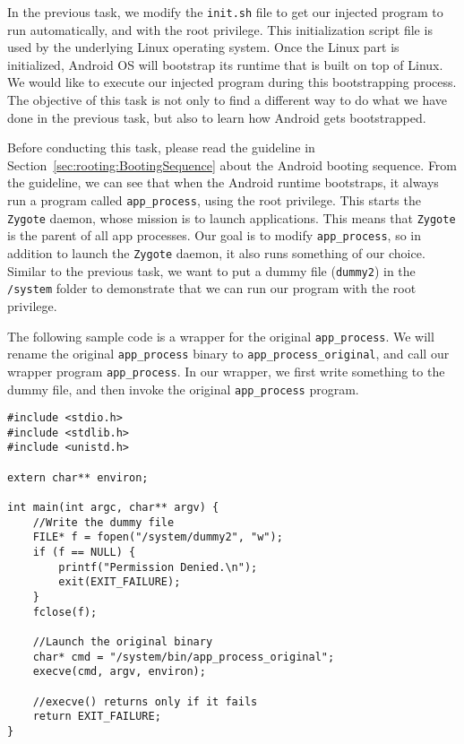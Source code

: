 In the previous task, we modify the \texttt{init.sh} file to get our injected program to
run automatically, and with the root privilege. This initialization script file is 
used by the underlying Linux operating system. Once the Linux part is initialized, Android OS
will bootstrap its runtime that is built on top of Linux. We would like to execute our injected
program during this bootstrapping process. The objective of this task is not only to find a
different way to do what we have done in the previous task, but also to learn how Android
gets bootstrapped. 


Before conducting this task, please read the guideline in
Section~\ref{sec:rooting:BootingSequence} about the Android booting sequence. From the guideline,
we can see that when the Android runtime bootstraps, it always run
a program called \texttt{app\_process}, using the root privilege. This starts the \texttt{Zygote}
daemon, whose mission is to launch applications. This means that \texttt{Zygote} is the
parent of all app processes. Our goal is to modify \texttt{app\_process}, so in addition to
launch the \texttt{Zygote} daemon, it also runs something of our choice. Similar to the
previous task, we want to put a dummy file (\texttt{dummy2}) in the \texttt{/system} folder
to demonstrate that we can run our program with the root privilege. 

The following sample code is a wrapper for the original \texttt{app\_process}. 
We will rename the original \texttt{app\_process} binary to \texttt{app\_process\_original},      
and call our wrapper program \texttt{app\_process}. In our wrapper, we first 
write something to the dummy file, and then invoke the original \texttt{app\_process} program. 


\begin{lstlisting}[frame=single, caption={}, label=label]
#include <stdio.h>  
#include <stdlib.h> 
#include <unistd.h> 

extern char** environ;

int main(int argc, char** argv) {
    //Write the dummy file
    FILE* f = fopen("/system/dummy2", "w");
    if (f == NULL) {
        printf("Permission Denied.\n");
        exit(EXIT_FAILURE);
    }
    fclose(f);
    
    //Launch the original binary
    char* cmd = "/system/bin/app_process_original";
    execve(cmd, argv, environ);
    
    //execve() returns only if it fails
    return EXIT_FAILURE;
}
\end{lstlisting}

